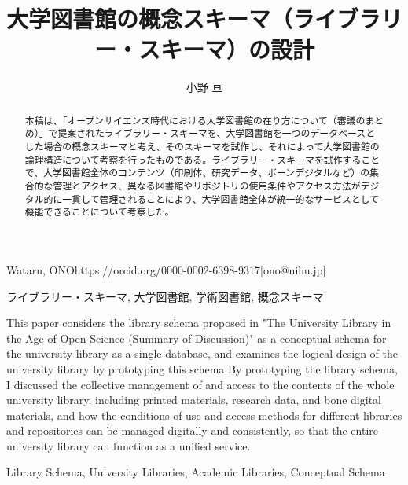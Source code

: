 \documentclass[submit,noauthor]{ono}
\begin{document}
\title{大学図書館の概念スキーマ（ライブラリー・スキーマ）の設計\\}



\author{小野 亘}{Wataru, ONO}{https://orcid.org/0000-0002-6398-9317}[ono@nihu.jp]

\begin{abstract}
本稿は、「オープンサイエンス時代における大学図書館の在り方について（審議のまとめ）」で提案されたライブラリー・スキーマを、大学図書館を一つのデータベースとした場合の概念スキーマと考え、そのスキーマを試作し、それによって大学図書館の論理構造について考察を行ったものである。ライブラリー・スキーマを試作することで、大学図書館全体のコンテンツ（印刷体、研究データ、ボーンデジタルなど）の集合的な管理とアクセス、異なる図書館やリポジトリの使用条件やアクセス方法がデジタル的に一貫して管理されることにより、大学図書館全体が統一的なサービスとして機能できることについて考察した。
\end{abstract}

	\begin{jkeyword}
		ライブラリー・スキーマ, 大学図書館, 学術図書館, 概念スキーマ
	\end{jkeyword}
	
\begin{eabstract}
	This paper considers the library schema proposed in "The University Library in the Age of Open Science (Summary of Discussion)" as a conceptual schema for the university library as a single database, and examines the logical design of the university library by prototyping this schema
	By prototyping the library schema, I discussed the collective management of and access to the contents of the whole university library, including printed materials, research data, and bone digital materials, and how the conditions of use and access methods for different libraries and repositories can be managed digitally and consistently, so that the entire university library can function as a unified service.
\end{eabstract}
	
	\begin{ekeyword}
		Library Schema, University Libraries, Academic Libraries, Conceptual Schema
	\end{ekeyword}
	
\end{document}
